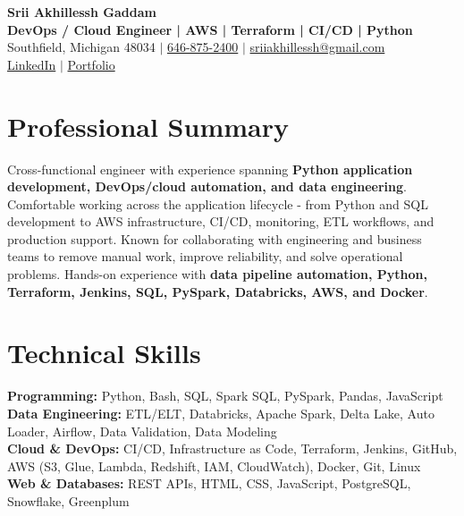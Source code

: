 \documentclass[letterpaper,10pt]{article}
\begin{document}
\fontsize{9.35pt}{10.45pt}\selectfont

\begin{center}
    {\LARGE \textbf{Srii Akhillessh Gaddam}} \\[-1pt]
    \textbf{DevOps / Cloud Engineer | AWS | Terraform | CI/CD | Python} \\[2pt]
    Southfield, Michigan 48034 $|$
    \href{tel:6468752400}{646-875-2400} $|$
    \href{mailto:sriiakhillessh@gmail.com}{sriiakhillessh@gmail.com} \\[1pt]
    \href{https://www.linkedin.com/in/srii-akhiilessh-gaddam-b48668191/}{LinkedIn} $|$
    \href{https://sriiakhillesshg.github.io/portfolio/}{Portfolio}
\end{center}
\vspace{-8pt}

\section{Professional Summary}
\small{Cross-functional engineer with experience spanning \textbf{Python application development, DevOps/cloud automation, and data engineering}. Comfortable working across the application lifecycle - from Python and SQL development to AWS infrastructure, CI/CD, monitoring, ETL workflows, and production support. Known for collaborating with engineering and business teams to remove manual work, improve reliability, and solve operational problems. Hands-on experience with \textbf{data pipeline automation, Python, Terraform, Jenkins, SQL, PySpark, Databricks, AWS, and Docker}.}

\section{Technical Skills}
\small{
\textbf{Programming:} Python, Bash, SQL, Spark SQL, PySpark, Pandas, JavaScript \\
\textbf{Data Engineering:} ETL/ELT, Databricks, Apache Spark, Delta Lake, Auto Loader, Airflow, Data Validation, Data Modeling \\
\textbf{Cloud \& DevOps:} CI/CD, Infrastructure as Code, Terraform, Jenkins, GitHub, AWS (S3, Glue, Lambda, Redshift, IAM, CloudWatch), Docker, Git, Linux \\
\textbf{Web \& Databases:} REST APIs, HTML, CSS, JavaScript, PostgreSQL, Snowflake, Greenplum
}
\end{document}
